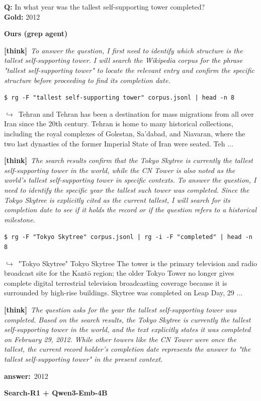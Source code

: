 \documentclass{article} %
\newcommand{\cmark}{\textcolor{green!45!black}{\ding{51}}}
\newcommand{\xmark}{\textcolor{red!60!black}{\ding{55}}}
\newcommand{\winbadge}{\colorbox{green!50!black}{\textcolor{white}{\scriptsize\bfseries\,WIN\,}}}
\newcommand{\thk}[1]{{\footnotesize\textcolor{violet!75!black}{\textbf{[think]}}\ \textit{#1}\par}}
\newcommand{\cmd}[1]{{\footnotesize\texttt{\textcolor{blue!35!black}{\$\ #1}}\par}}
\newcommand{\retr}[1]{{\footnotesize\textcolor{black!65}{\quad$\hookrightarrow$\ #1}\par}}
\newcommand{\ans}[1]{{\footnotesize\textbf{answer:}\ #1\par}}
\begin{document}
\begin{cmpbox}[label={ex:bamboogle-skytree},title={\winbadge\ \ \textsc{Bamboogle -- current vs.\ stale record-holder}}]
\textbf{Q:} In what year was the tallest self-supporting tower completed?\\[1pt]
\textbf{Gold:} 2012\par\smallskip
\textbf{Ours (grep agent)}~\cmark\par
  \thk{To answer the question, I first need to identify which structure is the tallest self-supporting tower. I will search the Wikipedia corpus for the phrase "tallest self-supporting tower" to locate the relevant entry and confirm the specific structure before proceeding to find its completion date.}
  \cmd{rg -F "tallest self-supporting tower" corpus.jsonl | head -n 8}
  \retr{Tehran and Tehran has been a destination for mass migrations from all over Iran since the 20th century. Tehran is home to many historical collections, including the royal complexes of Golestan, Sa'dabad, and Niavaran, where the two last dynasties of the former Imperial State of Iran were seated. Teh ...}
  \thk{The search results confirm that the Tokyo Skytree is currently the tallest self-supporting tower in the world, while the CN Tower is also noted as the world's tallest self-supporting tower in specific contexts. To answer the question, I need to identify the specific year the tallest such tower was completed. Since the Tokyo Skytree is explicitly cited as the current tallest, I will search for its completion date to see if it holds the record or if the question refers to a historical milestone.}
  \cmd{rg -F "Tokyo Skytree" corpus.jsonl | rg -i -F "completed" | head -n 8}
  \retr{"Tokyo Skytree" Tokyo Skytree The tower is the primary television and radio broadcast site for the Kantō region; the older Tokyo Tower no longer gives complete digital terrestrial television broadcasting coverage because it is surrounded by high-rise buildings. Skytree was completed on Leap Day, 29 ...}
  \thk{The question asks for the year the tallest self-supporting tower was completed. Based on the search results, the Tokyo Skytree is currently the tallest self-supporting tower in the world, and the text explicitly states it was completed on February 29, 2012. While other towers like the CN Tower were once the tallest, the current record holder's completion date represents the answer to "the tallest self-supporting tower" in the present context.}
  \ans{2012}
\smallskip\par\textbf{Search-R1 + Qwen3-Emb-4B}~\xmark\par

\end{cmpbox}
\end{document}
